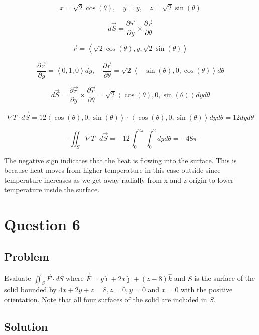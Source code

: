 \documentclass[12pt]{article}
\begin{document}
\[
    x = \sqrt{2} \cos(\theta), \quad y = y, \quad z = \sqrt{2} \sin(\theta)
\]

\[
    d\vec{S}
    = \frac{\partial \vec{r}}{\partial y} \times \frac{\partial \vec{r}}{\partial \theta}
\]

\[
    \vec{r} = \left\langle \sqrt{2} \cos(\theta), y, \sqrt{2} \sin(\theta)\right\rangle
\]

\[
    \frac{\partial \vec{r}}{\partial y}
    = \left\langle 0, 1, 0\right\rangle dy, \quad \frac{\partial \vec{r}}{\partial \theta}
    = \sqrt{2} \left\langle -\sin(\theta), 0, \cos(\theta)\right\rangle d\theta
\]

\[
    d\vec{S}
    = \frac{\partial \vec{r}}{\partial y} \times \frac{\partial \vec{r}}{\partial \theta}
    = \sqrt{2} \left\langle \cos(\theta), 0, \sin(\theta)\right\rangle dy d\theta
\]

\[
    \nabla T \cdot d\vec{S}
    = 12 \left\langle \cos(\theta), 0, \sin(\theta)\right\rangle \cdot \left\langle \cos(\theta), 0, \sin(\theta)\right\rangle dy d\theta
    = 12 dy d\theta
\]

\[
    -\iint_S \nabla T \cdot d\vec{S}
    = - 12 \int_{0}^{2\pi} \int_{0}^{2} dy d\theta
    = - 48 \pi
\]

The negative sign indicates that the heat is flowing into the surface. This is because heat moves
from higher temperature in this case outside since temperature increases as we get away radially
from x and z origin to lower temperature inside the surface.

\newpage
\section{Question 6}

\subsection{Problem}

Evaluate \(\iint_S \vec{F} \cdot d S\) where
\(\vec{F} = y \hat{\imath} + 2x \hat{\jmath} + (z - 8) \hat{k}\) and \(S\) is the surface of the
solid bounded by \(4x + 2y + z = 8, z = 0, y = 0\) and \(x = 0\) with the positive orientation.
Note that all four surfaces of the solid are included in \(S\).

\subsection{Solution}



\newpage


\nocite{El-Deeb_PEU-218_Assignments}
\end{document}
